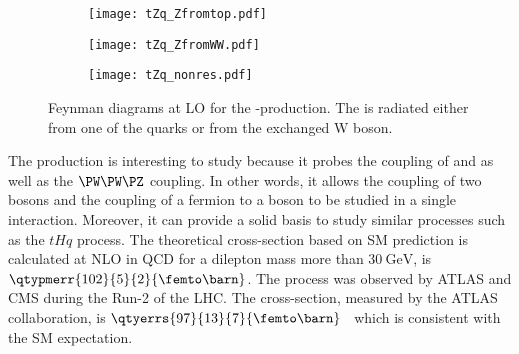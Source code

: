 \begin{figure}[htbp]
    \centering
    \begin{subfigure}{0.35\figwidth}
      \centering
      \texttt{[image: tZq\_Zfromtop.pdf]}
      \caption{}
      \label{fig:tZqfeyna}
    \end{subfigure}
    \begin{subfigure}{0.35\figwidth}
      \centering
      \texttt{[image: tZq\_ZfromWW.pdf]}
      \caption{}
      \label{fig:tZqfeynb}
    \end{subfigure}
  
  
  \medskip
  
  
  \begin{subfigure}{0.35\figwidth}
      \centering
      \texttt{[image: tZq\_nonres.pdf]}
      \caption{}
         \label{fig:tZqfeync}
    \end{subfigure}
  
  \caption[Feynman diagrams at LO for the \tZq-production]{Feynman diagrams at 
  LO for the \tZq-production. The \PZ is radiated either from one of the
  quarks or from the exchanged W boson. }
  \label{fig:tZqfeyn}
  \end{figure}

The \tZq production is interesting to study because it probes the coupling of \Ptop and \PZ as well as 
the $\PW\PW\PZ$ coupling. In other words, it allows the coupling
of two bosons and the coupling of a fermion to a boson to be studied in a single interaction. Moreover, 
it can provide a solid basis to study similar processes such as the $tHq$ process. 
The theoretical cross-section based on SM prediction is calculated at NLO in QCD
for a dilepton mass more than $\qty{30}{\GeV}$, is $\qtypmerr{102}{5}{2}{\femto\barn}$. The \tZq
process was observed by ATLAS and CMS during the Run-2 of the LHC.
The cross-section, measured by the ATLAS collaboration, is $\qtyerrs{97}{13}{7}{\femto\barn}$~\cite{Aad2020} which
is consistent with the SM expectation. 

